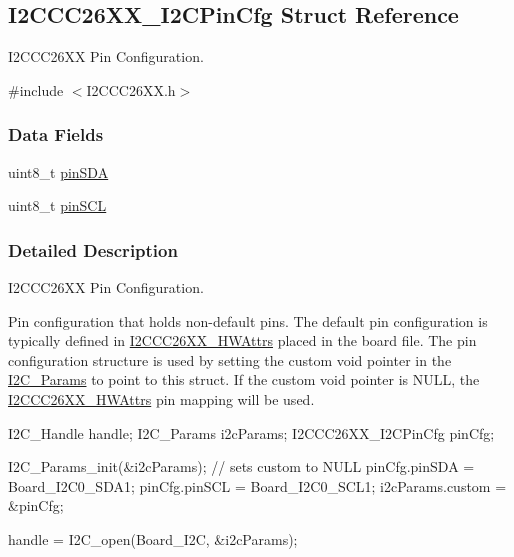 \subsection{I2\+C\+C\+C26\+X\+X\+\_\+\+I2\+C\+Pin\+Cfg Struct Reference}
\label{struct_i2_c_c_c26_x_x___i2_c_pin_cfg}


I2\+C\+C\+C26\+X\+X Pin Configuration.  




{\ttfamily \#include $<$I2\+C\+C\+C26\+X\+X.\+h$>$}

\subsubsection*{Data Fields}
\begin{DoxyCompactItemize}
\item 
uint8\+\_\+t \hyperlink{struct_i2_c_c_c26_x_x___i2_c_pin_cfg_a07155d4bf6fac9ed7181eca65563e2c9}{pin\+S\+D\+A}
\item 
uint8\+\_\+t \hyperlink{struct_i2_c_c_c26_x_x___i2_c_pin_cfg_af6a6d421ac74746b80065a3e9de338d6}{pin\+S\+C\+L}
\end{DoxyCompactItemize}


\subsubsection{Detailed Description}
I2\+C\+C\+C26\+X\+X Pin Configuration. 

Pin configuration that holds non-\/default pins. The default pin configuration is typically defined in \hyperlink{struct_i2_c_c_c26_x_x___h_w_attrs}{I2\+C\+C\+C26\+X\+X\+\_\+\+H\+W\+Attrs} placed in the board file. The pin configuration structure is used by setting the custom void pointer in the \hyperlink{struct_i2_c___params}{I2\+C\+\_\+\+Params} to point to this struct. If the custom void pointer is N\+U\+L\+L, the \hyperlink{struct_i2_c_c_c26_x_x___h_w_attrs}{I2\+C\+C\+C26\+X\+X\+\_\+\+H\+W\+Attrs} pin mapping will be used. 
\begin{DoxyCode}
I2C_Handle handle;
I2C_Params i2cParams;
I2CCC26XX_I2CPinCfg pinCfg;

I2C_Params_init(&i2cParams);     \textcolor{comment}{// sets custom to NULL}
pinCfg.pinSDA = Board\_I2C0\_SDA1;
pinCfg.pinSCL = Board\_I2C0\_SCL1;
i2cParams.custom = &pinCfg;

handle = I2C_open(Board\_I2C, &i2cParams);
\end{DoxyCode}
 

